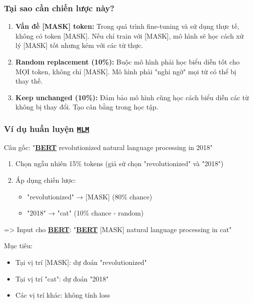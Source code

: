 \subsubsection{Tại sao cần chiến lược này?}
\begin{enumerate}
    \item \textbf{Vấn đề [MASK] token:} Trong quá trình fine-tuning và sử dụng thực tế, không có token [MASK].
    Nếu chỉ train với [MASK], mô hình sẽ học cách xử lý [MASK] tốt nhưng kém với các từ thực.
    \item \textbf{Random replacement (10\%):} Buộc mô hình phải học biểu diễn tốt cho MỌI token, không chỉ [MASK].
    Mô hình phải "nghi ngờ" mọi từ có thể bị thay thế.
    \item \textbf{Keep unchanged (10\%):} Đảm bảo mô hình cũng học cách biểu diễn các từ không bị thay đổi.
    Tạo cân bằng trong học tập.
\end{enumerate}

\subsubsection{Ví dụ huấn luyện \hyperref[acro:mlm]{\texttt{MLM}}}
Câu gốc: "\hyperref[acro:bert]{\textbf{BERT}} revolutionized natural language processing in 2018"
\begin{enumerate}
    \item Chọn ngẫu nhiên 15\% tokens (giả sử chọn "revolutionized" và "2018")

    \item Áp dụng chiến lược:
    \begin{itemize}
        \item "revolutionized" → [MASK] (80\% chance)
        \item "2018" → "cat" (10\% chance - random)
    \end{itemize}
\end{enumerate}

=> Input cho \hyperref[acro:bert]{\textbf{BERT}}: "\hyperref[acro:bert]{\textbf{BERT}} [MASK] natural language processing in cat"

Mục tiêu: 
\begin{itemize}
    \item Tại vị trí [MASK]: dự đoán
    "revolutionized"
    \item Tại vị trí "cat": dự đoán "2018"
    \item Các vị trí khác: không tính loss
\end{itemize}

